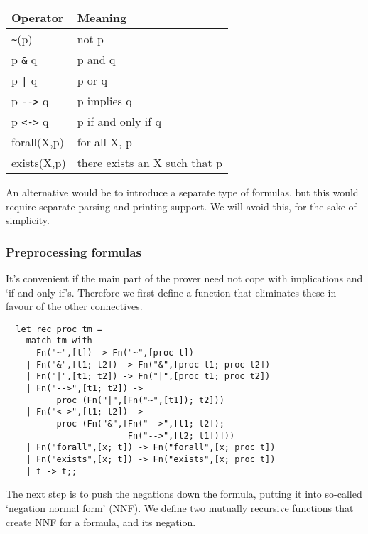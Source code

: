 \begin{center}
\begin{tabular}{|l|l|}
\hline
Operator   & Meaning                             \\
\hline
{\verb+~+}(p)    & not p                         \\
p {\verb+&+} q   & p and q                       \\
p {\verb+|+} q   & p or q                        \\
p {\verb+-->+} q & p implies q                   \\
p {\verb+<->+} q & p if and only if q            \\
forall(X,p)      & for all X, p                  \\
exists(X,p)      & there exists an X such that p \\
\hline
\end{tabular}
\end{center}

An alternative would be to introduce a separate type of formulas, but this
would require separate parsing and printing support. We will avoid this, for
the sake of simplicity.

\subsubsection*{Preprocessing formulas}

It's convenient if the main part of the prover need not cope with implications
and `if and only if's. Therefore we first define a function that eliminates
these in favour of the other connectives.

\begin{boxed}\begin{verbatim}
  let rec proc tm =
    match tm with
      Fn("~",[t]) -> Fn("~",[proc t])
    | Fn("&",[t1; t2]) -> Fn("&",[proc t1; proc t2])
    | Fn("|",[t1; t2]) -> Fn("|",[proc t1; proc t2])
    | Fn("-->",[t1; t2]) ->
          proc (Fn("|",[Fn("~",[t1]); t2]))
    | Fn("<->",[t1; t2]) ->
          proc (Fn("&",[Fn("-->",[t1; t2]);
                        Fn("-->",[t2; t1])]))
    | Fn("forall",[x; t]) -> Fn("forall",[x; proc t])
    | Fn("exists",[x; t]) -> Fn("exists",[x; proc t])
    | t -> t;;
\end{verbatim}\end{boxed}

The next step is to push the negations down the formula, putting it into
so-called `negation normal form' (NNF). We define two mutually recursive
functions that create NNF for a formula, and
its negation.

